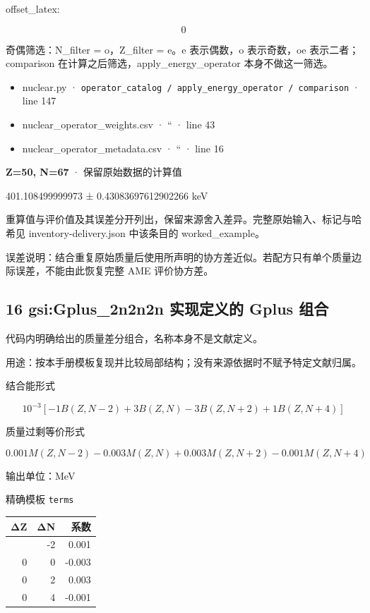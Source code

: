 \documentclass[
  11pt,
  letterpaper,
]{article}
\providecommand{\tightlist}{%
  \setlength{\itemsep}{0pt}\setlength{\parskip}{0pt}}
\begin{document}
offset\_latex:

\[
0
\]

奇偶筛选：N\_filter = o，Z\_filter = e。e 表示偶数，o 表示奇数，oe
表示二者；comparison 在计算之后筛选，apply\_energy\_operator
本身不做这一筛选。

\begin{itemize}
\tightlist
\item
  nuclear.py ·
  \texttt{operator\_catalog\ /\ apply\_energy\_operator\ /\ comparison}
  · line 147
\item
  nuclear\_operator\_weights.csv · `` · line 43
\item
  nuclear\_operator\_metadata.csv · `` · line 16
\end{itemize}

\textbf{Z=50, N=67} · 保留原始数据的计算值

401.108499999973 ± 0.43083697612902266 keV

重算值与评价值及其误差分开列出，保留来源舍入差异。完整原始输入、标记与哈希见
inventory-delivery.json 中该条目的 worked\_example。

误差说明：结合重复原始质量后使用所声明的协方差近似。若配方只有单个质量边际误差，不能由此恢复完整
AME 评价协方差。

\subsection{16 gsi:Gplus\_2n2n2n 实现定义的 Gplus
组合}\label{gsigplus_2n2n2n-ux5b9eux73b0ux5b9aux4e49ux7684-gplus-ux7ec4ux5408}

代码内明确给出的质量差分组合，名称本身不是文献定义。

用途：按本手册模板复现并比较局部结构；没有来源依据时不赋予特定文献归属。

结合能形式

\[
10^{-3}[-1B(Z,N-2)+3B(Z,N)-3B(Z,N+2)+1B(Z,N+4)]
\]

质量过剩等价形式

\[
0.001M(Z,N-2)-0.003M(Z,N)+0.003M(Z,N+2)-0.001M(Z,N+4)
\]

输出单位：MeV

精确模板 \texttt{terms}

\begin{longtable}[]{@{}rrr@{}}
\toprule\noalign{}
ΔZ & ΔN & 系数 \\
\midrule\noalign{}
\endhead
\bottomrule\noalign{}
\endlastfoot
0 & -2 & 0.001 \\
0 & 0 & -0.003 \\
0 & 2 & 0.003 \\
0 & 4 & -0.001 \\
\end{longtable}
\end{document}
